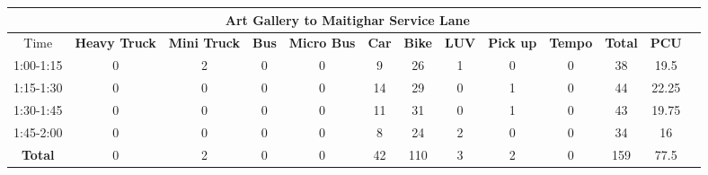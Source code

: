 \begin{landscape}
\begin{table}[h!]
\vspace{0.5cm}
\begin{tabular}{|c|c|c|c|c|c|c|c|c|c|c|c|c|}
    \hline
    \multicolumn{12}{|c|}{\textbf{Art Gallery to Maitighar Service Lane}} \\
    \hline
        Time & \textbf{Heavy Truck} & \textbf{Mini Truck} & \textbf{Bus} & \textbf{Micro Bus} & \textbf{Car} & \textbf{Bike} & \textbf{LUV} & \textbf{Pick up} & \textbf{Tempo} & \textbf{\textbf{Total}} & \textbf{PCU} \\
    \hline
1:00-1:15	&0	&2	&0	&0	&9	&26	&1	&0	&0	&38	&19.5 \\ \hline
1:15-1:30	&0	&0	&0	&0	&14	&29	&0	&1	&0	&44	&22.25 \\ \hline
1:30-1:45	&0	&0	&0	&0	&11	&31	&0	&1	&0	&43	&19.75 \\ \hline
1:45-2:00	&0	&0	&0	&0	&8	&24	&2	&0	&0	&34	&16 \\ \hline
\textbf{Total}	&0	&2	&0	&0	&42	&110	&3	&2	&0	&159	&77.5 \\ \hline


\end{tabular}

\end{table}
\end{landscape}


